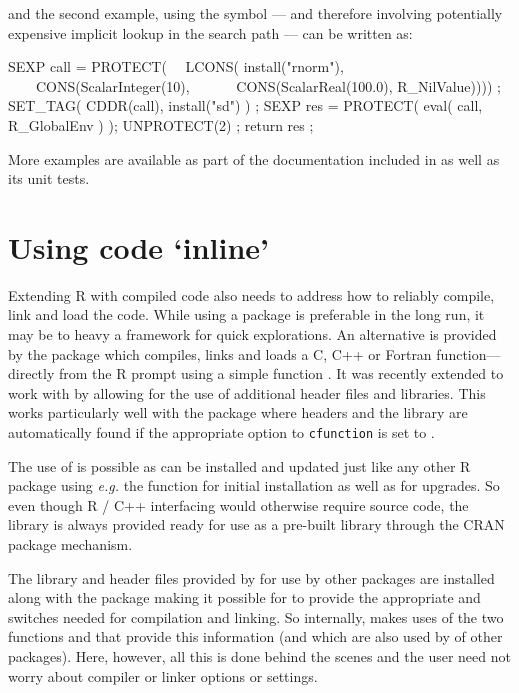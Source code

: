 and the second example, using the  symbol --- and therefore
involving potentially expensive implicit lookup in the search path ---
can be written as:

\begin{example}
SEXP call  = PROTECT( 
\ \ LCONS( install("rnorm"), 
\ \ \ \ CONS(ScalarInteger(10), 
\ \ \ \ \ \ CONS(ScalarReal(100.0), R_NilValue)))) ;
SET_TAG( CDDR(call), install("sd") ) ;
SEXP res = PROTECT( eval( call, R_GlobalEnv ) );
UNPROTECT(2) ;
return res ;
\end{example}

More examples are available as part of the documentation
included in  as well as its unit tests.

\section{Using code `inline'}
\label{sec:inline}

Extending R with compiled code also needs to address how to reliably compile,
link and load the code.  While using a package is preferable in the long run,
it may be to heavy a framework for quick explorations.  An alternative is
provided by the  package \citep{cran:inline} which compiles,
links and loads a C, C++ or Fortran function---directly from the R prompt
using a simple function .  It was recently extended to work
with  by allowing for the use of additional header files and
libraries. This works particularly well with the  package where
headers and the library are automatically found if the appropriate option
 to \texttt{cfunction} is set to .

The use of  is possible as  can be installed and
updated just like any other R package using \textsl{e.g.} the
 function for initial installation as well as
 for upgrades.  So even though R / C++ interfacing
would otherwise require source code, the  library is always provided
ready for use as a pre-built library through the CRAN package mechanism.

The library and header files provided by  for use by other packages
are installed along with the  package making it possible for
 to provide the appropriate  and  switches needed
for compilation and linking.  So internally,  makes uses of the
two functions  and  that
provide this information (and which are also used by  of
other packages).  Here, however, all this is done behind the scenes and the
user need not worry about compiler or linker options or settings.

